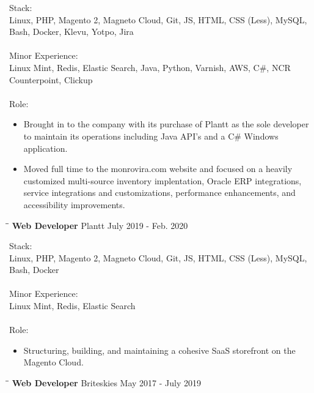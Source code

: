 \documentclass{res}
\begin{document}
\begin{resume}
    Stack: \\
	Linux, PHP, Magento 2, Magneto Cloud, Git, JS, HTML, CSS (Less), MySQL, Bash, Docker, Klevu, Yotpo, Jira \\
	\\
	Minor Experience: \\
	Linux Mint, Redis, Elastic Search, Java, Python, Varnish, AWS, C\#, NCR Counterpoint, Clickup \\
	\\
	Role: \\
	\vspace{-0.15in}	
	\begin{itemize}
		\item Brought in to the company with its purchase of Plantt as the sole developer to maintain its operations including Java API's and a C\# Windows application.
		\item Moved full time to the monrovira.com website and focused on a heavily customized multi-source inventory implentation, Oracle ERP integrations, service integrations and customizations, performance enhancements, and accessibility improvements.
	\end{itemize}

   \begin{tabbing}
   		\hspace{2.0in}\= \hspace{2.7in}\= \kill %
    	\textbf{Web Developer} \>Plantt \>July 2019 - Feb. 2020\\
   \end{tabbing}\vspace{-20pt}      %
   
    Stack: \\
	Linux, PHP, Magento 2, Magneto Cloud, Git, JS, HTML, CSS (Less), MySQL, Bash, Docker \\
	\\
	Minor Experience: \\
	Linux Mint, Redis, Elastic Search \\
	\\
	Role: \\
	\vspace{-0.15in}	
	\begin{itemize}
		\item Structuring, building, and maintaining a cohesive SaaS storefront on the Magento Cloud.
	\end{itemize}
   
   \begin{tabbing}
   		\hspace{2.0in}\= \hspace{2.7in}\= \kill %
    	\textbf{Web Developer} \>Briteskies     \>May 2017 - July 2019\\
   \end{tabbing}\vspace{-20pt}      %
   

\end{resume}
\end{document}
